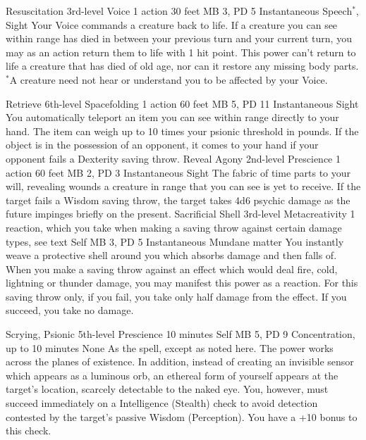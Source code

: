 \DndPowerHeader%
    {Resuscitation\label{pwr:resuscitation}}
    {3rd-level Voice}
    {1 action}
    {30 feet}
    {MB 3, PD 5}
    {Instantaneous}
    {Speech$^*$, Sight}
Your Voice commands a creature back to life.
If a creature you can see within range has died in between
your previous turn and your current turn, you may as an action
return them to life with 1 hit point. This power can't return
to life a creature that has died of old age, nor can it restore
any missing body parts.
$^*$A creature need not hear or understand you to be affected
by your Voice.

\DndPowerHeader%
    {Retrieve\label{pwr:retrieve}}
    {6th-level Spacefolding}
    {1 action}
    {60 feet}
    {MB 5, PD 11}
    {Instantaneous}
    {Sight}
You automatically teleport an item you can
see within range directly to your hand. The item can weigh
up to 10 times your psionic threshold in pounds. If the object
is in the possession of an opponent, it comes to your hand
if your opponent fails a Dexterity saving throw.
\DndPowerHeader%
    {Reveal Agony\label{pwr:reveal-agony}}
    {2nd-level Prescience}
    {1 action}
    {60 feet}
    {MB 2, PD 3}
    {Instantaneous}
    {Sight}
The fabric of time parts to your will, revealing
wounds a creature in range that you can see
is yet to receive. If the target
fails a Wisdom saving throw, the target takes 4d6 psychic
damage as the future impinges briefly on the present.
\DndPowerHeader%
    {Sacrificial Shell\label{pwr:sacrificial-shell}}
    {3rd-level Metacreativity}
    {1 reaction, which you take when making a saving throw against certain damage types, see text}
    {Self}
    {MB 3, PD 5}
    {Instantaneous}
    {Mundane matter}
You instantly weave a protective shell around
you which absorbs damage and then falls of. When you make
a saving throw against an effect which would deal fire, cold,
lightning or thunder damage, you may manifest this power as
a reaction. For this saving throw only, if you fail, you take
only half damage from the effect. If you succeed, you take
no damage.

\DndPowerHeader%
    {Scrying, Psionic\label{pwr:scrying-psionic}}
    {5th-level Prescience}
    {10 minutes}
    {Self}
    {MB 5, PD 9}
    {Concentration, up to 10 minutes}
    {None}
As the  spell, except as noted
here. The power works across the planes of existence. In addition,
instead of creating an invisible sensor which appears as a
luminous orb, an ethereal form of yourself appears at the
target's location, scarcely detectable to the naked eye.
You, however, must succeed immediately on a Intelligence (Stealth)
check to avoid detection contested by the target's passive
Wisdom (Perception). You have a +10 bonus to this check.

